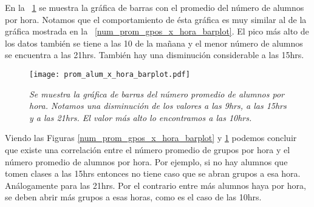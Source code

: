 En la \figurename{~\ref{prom_alum_x_hora_barplot}} se muestra la gráfica de barras con el promedio del número de alumnos por hora. Notamos que el comportamiento de ésta gráfica es muy similar al de la gráfica mostrada en la \figurename{~\ref{num_prom_gpos_x_hora_barplot}}. El pico más alto de los datos también se tiene a las 10 de la mañana y el menor número de alumnos se encuentra a las 21hrs. También hay una disminución considerable a las 15hrs.

\begin{figure}[H]
\centering
\texttt{[image: prom\_alum\_x\_hora\_barplot.pdf]} %
\caption[\textit{Número promedio de alumnos por hora}]{\textit{Se muestra la gráfica de barras del número promedio de alumnos por hora. Notamos una disminución de los valores a las 9hrs, a las 15hrs y a las 21hrs. El valor más alto lo encontramos a las 10hrs.}}\label{prom_alum_x_hora_barplot}
\end{figure}

Viendo las Figuras \ref{num_prom_gpos_x_hora_barplot} y \ref{prom_alum_x_hora_barplot} podemos concluir que existe una correlación entre el número promedio de grupos por hora y el número promedio de alumnos por hora. Por ejemplo, si no hay alumnos que tomen clases a las 15hrs entonces no tiene caso que se abran grupos a esa hora. Análogamente para las 21hrs. Por el contrario entre más alumnos haya por hora, se deben abrir más grupos a esas horas, como es el caso de las 10hrs.